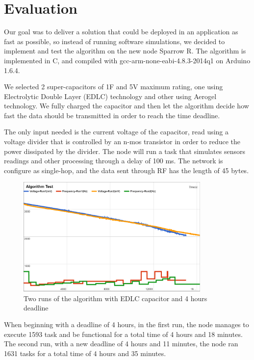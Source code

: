 \normalfont\normalsize
\chapter{Evaluation}

Our goal was to deliver a solution that could be deployed in an application as fast as possible, so
instead of running software simulations, we decided to implement and test the algorithm on the new
node Sparrow R. The algorithm is implemented in C, and compiled with gcc-arm-none-eabi-4.8.3-2014q1 on Arduino 1.6.4.

We selected 2 super-capacitors of 1F and 5V maximum rating, one using Electrolytic Double
Layer (EDLC) technology and other using Aerogel technology. We fully charged the capacitor and then
let the algorithm decide how fast the data should be transmitted in order to reach the time
deadline.

The only input needed is the current voltage of the capacitor, read using a voltage divider that is
controlled by an n-mos transistor in order to reduce the power dissipated by the divider. The node
will run a task that simulates sensors readings and other processing through a delay of 100 ms. The
network is configure as single-hop, and the data sent through RF has the length of 45 bytes.

\begin{figure}[ht] \centering
\includegraphics[width=0.85\textwidth]{img/algtest.png}
\caption{Two runs of the algorithm with EDLC capacitor and 4 hours deadline}
\end{figure}

When beginning with a deadline of 4 hours, in the first run, the node manages to execute 1593 task and be
functional for a total time of 4 hours and 18 minutes. The second run, with a new deadline of 4
hours and 11 minutes, the node ran 1631 tasks for a total time of 4 hours and 35 minutes.

